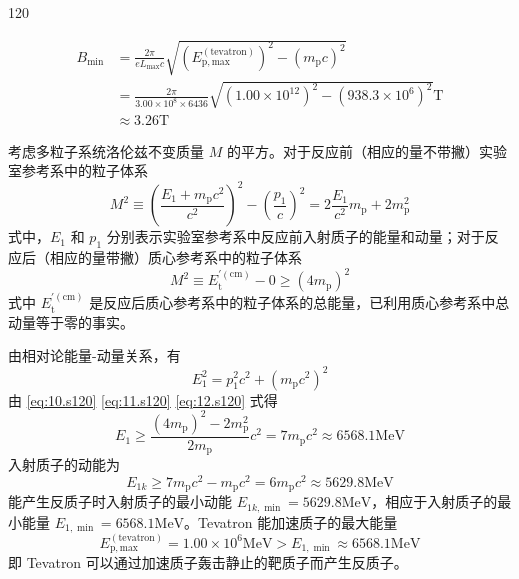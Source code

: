 \begin{solution}{120}
\begin{subsolution}
        \begin{align}
            B_{\min} & = \frac{2 \pi}{e L_{\max} c} \sqrt{(E_{\mathrm{p,max}}^{(\text{tevatron})})^{2} - (m_{\mathrm{p}} c)^{2}} \nonumber \\
            & = \frac{2 \pi}{3.00 \times 10^{8} \times 6436} \sqrt{(1.00 \times 10^{12})^{2} - (938.3 \times 10^{6})^{2}} \mathrm{T} \nonumber \\
            & \approx 3.26 \mathrm{T}
            \label{eq:9.s120}
        \end{align}
    \end{subsolution}
    \begin{subsolution}
        考虑多粒子系统洛伦兹不变质量 $M$ 的平方。对于反应前（相应的量不带撇）实验室参考系中的粒子体系
        \begin{equation}
            M^{2} \equiv \left(\frac{E_{1} + m_{\mathrm{p}} c^{2}}{c^{2}}\right)^{2} - \left(\frac{p_{1}}{c}\right)^{2} = 2 \frac{E_{1}}{c^{2}} m_{\mathrm{p}} + 2 m_{\mathrm{p}}^{2}
            \label{eq:10.s120}
        \end{equation}
        式中，$E_{1}$ 和 $p_{1}$ 分别表示实验室参考系中反应前入射质子的能量和动量；对于反应后（相应的量带撇）质心参考系中的粒子体系
        \begin{equation}
            M^{2} \equiv E_{\mathrm{t}}^{\prime (\mathrm{cm})} - 0 \geq (4 m_{\mathrm{p}})^{2}
            \label{eq:11.s120}
        \end{equation}
        式中 $E_{\mathrm{t}}^{\prime (\mathrm{cm})}$ 是反应后质心参考系中的粒子体系的总能量，已利用质心参考系中总动量等于零的事实。

        由相对论能量-动量关系，有
        \begin{equation}
            E_{1}^{2} = p_{1}^{2} c^{2} + (m_{\mathrm{p}} c^{2})^{2}
            \label{eq:12.s120}
        \end{equation}
        由 \eqref{eq:10.s120} \eqref{eq:11.s120} \eqref{eq:12.s120} 式得
        \begin{equation}
            E_{1} \geq \frac{(4 m_{\mathrm{p}})^{2} - 2 m_{\mathrm{p}}^{2}}{2 m_{\mathrm{p}}} c^{2} = 7 m_{\mathrm{p}} c^{2} \approx 6568.1 \mathrm{MeV}
            \label{eq:13.s120}
        \end{equation}
        入射质子的动能为
        \begin{equation}
            E_{1 k} \geq 7 m_{\mathrm{p}} c^{2} - m_{\mathrm{p}} c^{2} = 6 m_{\mathrm{p}} c^{2} \approx 5629.8 \mathrm{MeV}
            \label{eq:14.s120}
        \end{equation}
        能产生反质子时入射质子的最小动能 $E_{1k,\min} = 5629.8 \mathrm{MeV}$，相应于入射质子的最小能量 $E_{1,\min} = 6568.1 \mathrm{MeV}$。Tevatron 能加速质子的最大能量
        \begin{equation}
            E_{\mathrm{p,max}}^{(\text{tevatron})} = 1.00 \times 10^{6} \mathrm{MeV} > E_{1, \min} \approx 6568.1 \mathrm{MeV}
            \label{eq:15.s120}
        \end{equation}
        即 Tevatron 可以通过加速质子轰击静止的靶质子而产生反质子。
    \end{subsolution}
\end{solution}